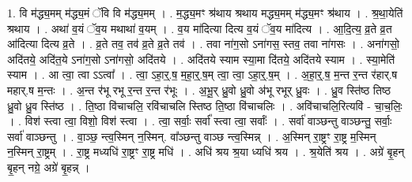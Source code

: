 \documentclass[17pt]{extarticle}
\begin{document}
1. वि म॑द्ध्य॒मम् म॑द्ध्य॒मं ॅवि वि म॑द्ध्य॒मम् । . म॒द्ध्य॒मꣳ श्र॑थाय श्रथाय मद्ध्य॒मम् म॑द्ध्य॒मꣳ श्र॑थाय । . श्र॒था॒येति॑ श्रथाय । . अथा॑ व॒यं ॅव॒य मथाथा॑ व॒यम् । . व॒य मा॑दित्या दित्य व॒यं ॅव॒य मा॑दित्य । . आ॒दि॒त्य॒ व्र॒ते व्र॒त आ॑दित्या दित्य व्र॒ते । . व्र॒ते तव॒ तव॑ व्र॒ते व्र॒ते तव॑ । . तवा ना॑ग॒सो ऽना॑गस॒ स्तव॒ तवा ना॑गसः । . अना॑गसो॒ अदि॑तये॒ अदि॑त॒ये ऽना॑ग॒सो ऽना॑गसो॒ अदि॑तये । . अदि॑तये स्याम स्या॒मा दि॑तये॒ अदि॑तये स्याम । . स्या॒मेति॑ स्याम । . आ त्वा॒ त्वा ऽऽत्वा᳚ । . त्वा॒ ऽहा॒र्॒.ष॒ म॒हा॒र्॒.ष॒म् त्वा॒ त्वा॒ ऽहा॒र्॒.ष॒म् । . अ॒हा॒र्॒.ष॒ म॒न्त र॒न्त र॑हार्.ष महार्.ष म॒न्तः । . अ॒न्त र॑भू रभू र॒न्त र॒न्त र॑भूः । . अ॒भू॒र् ध्रु॒वो ध्रु॒वो अ॑भू रभूर् ध्रु॒वः । . ध्रु॒व स्ति॑ष्ठ तिष्ठ ध्रु॒वो ध्रु॒व स्ति॑ष्ठ । . ति॒ष्ठा वि॑चाचलि॒ रवि॑चाचलि स्तिष्ठ ति॒ष्ठा वि॑चाचलिः । . अवि॑चाचलि॒रित्यवि॑ - चा॒च॒लिः॒ । . विश॑ स्त्वा त्वा॒ विशो॒ विश॑ स्त्वा । . त्वा॒ सर्वाः॒ सर्वा᳚ स्त्वा त्वा॒ सर्वाः᳚ । . सर्वा॑ वाञ्छन्तु वाञ्छन्तु॒ सर्वाः॒ सर्वा॑ वाञ्छन्तु । . वा॒ञ्छ॒ न्त्व॒स्मिन् न॒स्मिन्. वा᳚ञ्छन्तु वाञ्छ न्त्व॒स्मिन्न् । . अ॒स्मिन् रा॒ष्ट्रꣳ रा॒ष्ट्र म॒स्मिन् न॒स्मिन् रा॒ष्ट्रम् । . रा॒ष्ट्र मध्यधि॑ रा॒ष्ट्रꣳ रा॒ष्ट्र मधि॑ । . अधि॑ श्रय श्र॒या ध्यधि॑ श्रय । . श्र॒येति॑ श्रय । . अग्रे॑ बृ॒हन् बृ॒हन् नग्रे॒ अग्रे॑ बृ॒हन्न् । \newline
\end{document}
